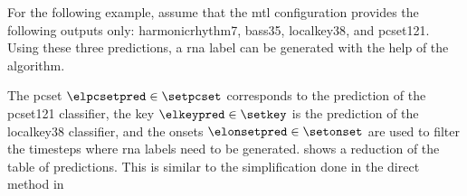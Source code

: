 
For the following example, assume that the \gls{mtl}
configuration provides the following outputs only:
\gls{harmonicrhythm7}, \gls{bass35},  \gls{localkey38}, and
\gls{pcset121}. Using these three predictions, a \gls{rna}
label can be generated with the help of the \algorithmrn{}
algorithm.

The \gls{pcset} $\elpcsetpred \in \setpcset$ corresponds to
the prediction of the \gls{pcset121} classifier, the key
$\elkeypred \in \setkey$ is the prediction of the
\gls{localkey38} classifier, and the onsets $\elonsetpred
\in \setonset$ are used to filter the timesteps where
\gls{rna} labels need to be generated.
 shows a reduction of the
table of predictions. This is similar to the simplification
done in the direct method in

